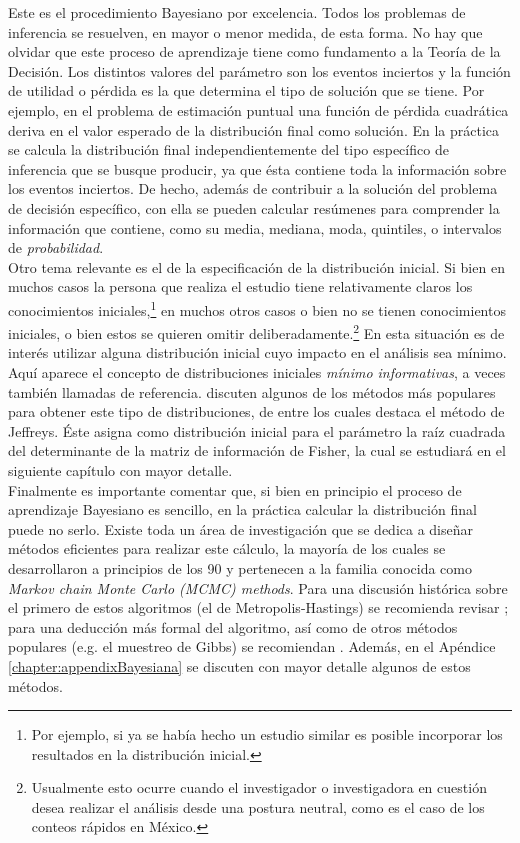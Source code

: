 Este es el procedimiento Bayesiano por excelencia. Todos los problemas de inferencia se resuelven, en mayor o menor medida, de esta forma. No hay que olvidar que este proceso de aprendizaje tiene como fundamento a la Teoría de la Decisión. Los distintos valores del parámetro son los eventos inciertos y la función de utilidad o pérdida es la que determina el tipo de solución que se tiene. Por ejemplo, en el problema de estimación puntual una función de pérdida cuadrática deriva en el valor esperado de la distribución final como solución. En la práctica se calcula la distribución final independientemente del tipo específico de inferencia que se busque producir, ya que ésta contiene toda la información sobre los eventos inciertos. De hecho, además de contribuir a la solución del problema de decisión específico, con ella se pueden calcular resúmenes para comprender la información que contiene, como su media, mediana, moda, quintiles, o intervalos de \textit{probabilidad}. \\


Otro tema relevante es el de la especificación de la distribución inicial. Si bien en muchos casos la persona que realiza el estudio tiene relativamente claros los conocimientos iniciales,\footnote{Por ejemplo, si ya se había hecho un estudio similar es posible incorporar los resultados en la distribución inicial.} en muchos otros casos o bien no se tienen conocimientos iniciales, o bien estos se quieren omitir deliberadamente.\footnote{Usualmente esto ocurre cuando el investigador o investigadora en cuestión desea realizar el análisis desde una postura neutral, como es el caso de los conteos rápidos en México.} En esta situación es de interés utilizar alguna distribución inicial cuyo impacto en el análisis sea mínimo. Aquí aparece el concepto de distribuciones iniciales \textit{mínimo informativas}, a veces también llamadas de referencia. \citet[Capítulo~6.4]{notas_bayes} discuten algunos de los métodos más populares para obtener este tipo de distribuciones, de entre los cuales destaca el método de Jeffreys. Éste asigna como distribución inicial para el parámetro la raíz cuadrada del determinante de la matriz de información de Fisher, la cual se estudiará en el siguiente capítulo con mayor detalle. \\


Finalmente es importante comentar que, si bien en principio el proceso de aprendizaje Bayesiano es sencillo, en la práctica calcular la distribución final puede no serlo. Existe toda un área de investigación que se dedica a diseñar métodos eficientes para realizar este cálculo, la mayoría de los cuales se desarrollaron a principios de los 90 y pertenecen a la familia conocida como \textit{Markov chain Monte Carlo (MCMC) methods}. Para una discusión histórica sobre el primero de estos algoritmos (el de Metropolis-Hastings) se recomienda revisar \citep{hitchcock_mh_history}; para una deducción más formal del algoritmo, así como de otros métodos populares (e.g. el muestreo de Gibbs) se recomiendan \citep{chib_mh_history,notas_mcmc_egp}. Además, en el Apéndice \ref{chapter:appendixBayesiana} se discuten con mayor detalle algunos de estos métodos.

